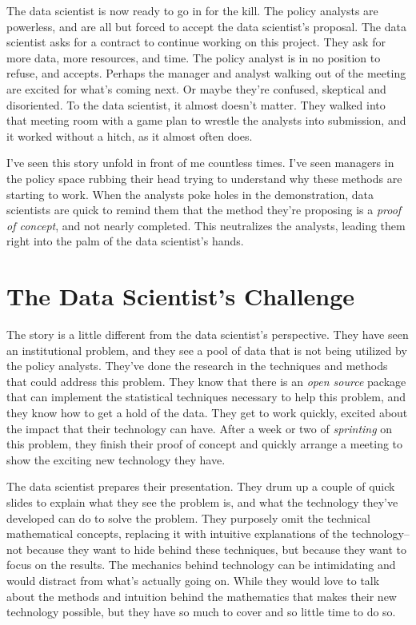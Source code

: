 \documentclass[]{book}
\begin{document}
The data scientist is now ready to go in for the kill. The policy analysts are powerless, and are all but forced to accept the data scientist's proposal. The data scientist asks for a contract to continue working on this project. They ask for more data, more resources, and time. The policy analyst is in no position to refuse, and accepts. Perhaps the manager and analyst walking out of the meeting are excited for what's coming next. Or maybe they're confused, skeptical and disoriented. To the data scientist, it almost doesn't matter. They walked into that meeting room with a game plan to wrestle the analysts into submission, and it worked without a hitch, as it almost often does.

I've seen this story unfold in front of me countless times. I've seen managers in the policy space rubbing their head trying to understand why these methods are starting to work. When the analysts poke holes in the demonstration, data scientists are quick to remind them that the method they're proposing is a \emph{proof of concept}, and not nearly completed. This neutralizes the analysts, leading them right into the palm of the data scientist's hands.

\hypertarget{the-data-scientists-challenge}{%
\section{The Data Scientist's Challenge}\label{the-data-scientists-challenge}}

The story is a little different from the data scientist's perspective. They have seen an institutional problem, and they see a pool of data that is not being utilized by the policy analysts. They've done the research in the techniques and methods that could address this problem. They know that there is an \emph{open source} package that can implement the statistical techniques necessary to help this problem, and they know how to get a hold of the data. They get to work quickly, excited about the impact that their technology can have. After a week or two of \emph{sprinting} on this problem, they finish their proof of concept and quickly arrange a meeting to show the exciting new technology they have.

The data scientist prepares their presentation. They drum up a couple of quick slides to explain what they see the problem is, and what the technology they've developed can do to solve the problem. They purposely omit the technical mathematical concepts, replacing it with intuitive explanations of the technology--not because they want to hide behind these techniques, but because they want to focus on the results. The mechanics behind technology can be intimidating and would distract from what's actually going on. While they would love to talk about the methods and intuition behind the mathematics that makes their new technology possible, but they have so much to cover and so little time to do so.
\end{document}
